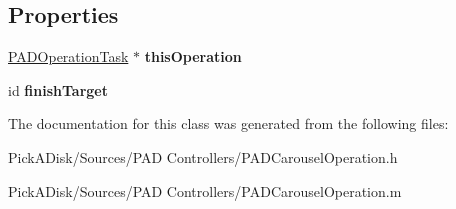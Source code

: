 \subsection*{Properties}
\begin{DoxyCompactItemize}
\item 
\hypertarget{interface_p_a_d_carousel_operation_a01f5b4bc6106042c33fc038c15a3bcf5}{
\hyperlink{interface_p_a_d_operation_task}{PADOperationTask} $\ast$ {\bfseries thisOperation}}
\label{interface_p_a_d_carousel_operation_a01f5b4bc6106042c33fc038c15a3bcf5}

\item 
\hypertarget{interface_p_a_d_carousel_operation_a23ea08226599f8f379e19f369ec01280}{
id {\bfseries finishTarget}}
\label{interface_p_a_d_carousel_operation_a23ea08226599f8f379e19f369ec01280}

\end{DoxyCompactItemize}


The documentation for this class was generated from the following files:\begin{DoxyCompactItemize}
\item 
PickADisk/Sources/PAD Controllers/PADCarouselOperation.h\item 
PickADisk/Sources/PAD Controllers/PADCarouselOperation.m\end{DoxyCompactItemize}
